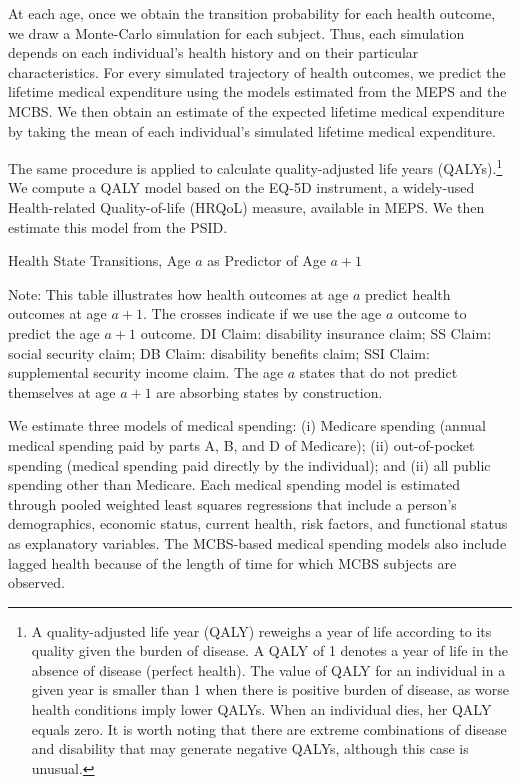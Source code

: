 At each age, once we obtain the transition probability for each health outcome, we draw a Monte-Carlo simulation for each subject. Thus, each simulation depends on each individual's health history and on their particular characteristics. For every simulated trajectory of health outcomes, we predict the lifetime medical expenditure using the models estimated from the MEPS and the MCBS. We then obtain an estimate of the expected lifetime medical expenditure by taking the mean of each individual's simulated lifetime medical expenditure. 

The same procedure is applied to calculate quality-adjusted life years (QALYs).\footnote{A quality-adjusted life year (QALY) reweighs a year of life according to its quality given the burden of disease. A QALY of 1 denotes a year of life in the absence of disease (perfect health). The value of QALY for an individual in a given year is smaller than 1 when there is positive burden of disease, as worse health conditions imply lower QALYs. When an individual dies, her QALY equals zero. It is worth noting that there are extreme combinations of disease and disability that may generate negative QALYs, although this case is unusual.} We compute a QALY model based on the EQ-5D instrument, a widely-used Health-related Quality-of-life (HRQoL) measure, available in MEPS. We then estimate this model from the PSID. 

\begin{table}
\begin{threeparttable}
\caption{Health State Transitions, Age $a$ as Predictor of Age $a+1$}\label{table:transition}
\scriptsize

\begin{tablenotes}
\footnotesize
\item Note: This table illustrates how health outcomes at age $a$ predict health outcomes at age $a+1$. The crosses indicate if we use the age $a$ outcome to predict the age $a+1$ outcome. DI Claim: disability insurance claim; SS Claim: social security claim; DB Claim: disability benefits claim; SSI Claim: supplemental security income claim. The age $a$ states that do not predict themselves at age $a+1$ are absorbing states by construction.
\end{tablenotes}
\end{threeparttable}
\end{table}

We estimate three models of medical spending: (i) Medicare spending (annual medical spending paid by parts A, B, and D of Medicare); (ii) out-of-pocket spending (medical spending paid directly by the individual); and (ii) all public spending other than Medicare. Each medical spending model is estimated through pooled weighted least squares regressions that include a person's demographics, economic status, current health, risk factors, and functional status as explanatory variables. The MCBS-based medical spending models also include lagged health because of the length of time for which MCBS subjects are observed.


